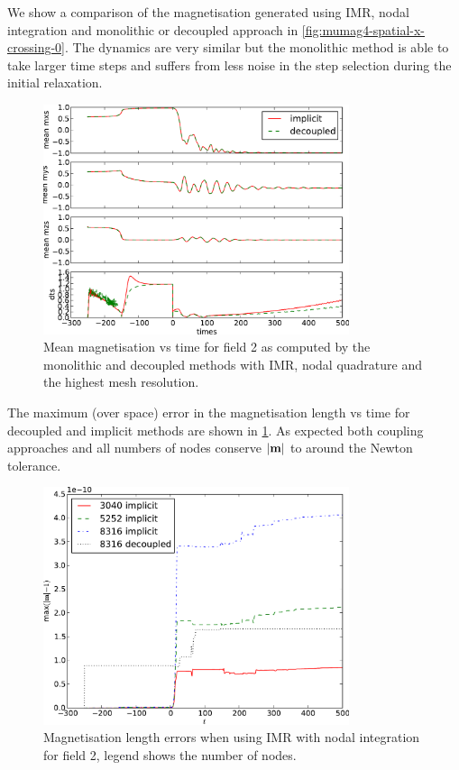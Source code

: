 We show a comparison of the magnetisation generated using IMR, nodal integration and monolithic or decoupled approach in \cref{fig:mumag4-spatial-x-crossing-0}.
The dynamics are very similar but the monolithic method is able to take larger time steps and suffers from less noise in the step selection during the initial relaxation.
\begin{figure}
  \centering
  \includegraphics[width=0.8\textwidth]{plots/monolithic_vs_decoupled/meanmxsvs-meanmysvs-meanmzsvs-dtsvstimes.pdf}
  \caption{Mean magnetisation vs time for field 2 as computed by the monolithic and decoupled methods with IMR, nodal quadrature and the highest mesh resolution.}
  \label{fig:mumag4-implicit-decoupled}
\end{figure}


The maximum (over space) error in the magnetisation length vs time for decoupled and implicit methods are shown in \cref{fig:mumag4-implicit-decoupled}.
As expected both coupling approaches and all numbers of nodes conserve $\left|{\boldsymbol{\mathrm{m}}} \right|$ to around the Newton tolerance.
\begin{figure}
  \centering
  \includegraphics[width=0.8\textwidth]{plots/mumag4_ml/mlengtherrormaxesvstimes.pdf}
  \caption{Magnetisation length errors when using IMR with nodal integration for field 2, legend shows the number of nodes.}
  \label{fig:imr-conservation}
\end{figure}



